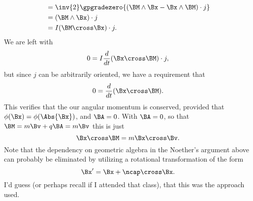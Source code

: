 {\begin{equation}
\begin{aligned}
&= \inv{2} \gpgradezero{ \left( \BM \wedge \Bx - \Bx \wedge \BM \right) \cdot j } \\
&= (\BM \wedge \Bx) \cdot j \\
&= I (\BM \cross \Bx) \cdot j.
\end{aligned}
\end{equation}
%
We are left with
%
\begin{equation}\label{eqn:classicalMechanicsPs2:910}
0 = I \frac{d}{dt} (\Bx \cross \BM) \cdot j,
\end{equation}
%
but since \(j\) can be arbitrarily oriented, we have a requirement that
%
\begin{equation}\label{eqn:classicalMechanicsPs2:930}
0 = \frac{d}{dt} (\Bx \cross \BM).
\end{equation}
%
This verifies that the our angular momentum is conserved, provided that \(\phi(\Bx) = \phi(\Abs{\Bx})\), and \(\BA = 0\).  With \(\BA = 0\), so that \(\BM = m \Bv + q \BA = m \Bv\) this is just
%
\begin{equation}\label{eqn:classicalMechanicsPs2:870}
\Bx \cross \BM = m \Bx \cross \Bv.
\end{equation}
%
Note that the dependency on geometric algebra in the Noether's argument above can probably be eliminated by utilizing a rotational transformation of the form
%
\begin{equation}\label{eqn:classicalMechanicsPs2:871}
\Bx' = \Bx + \ncap \cross \Bx.
\end{equation}
%
I'd guess (or perhaps recall if I attended that class), that this was the approach used.
%
%
%
%
}
%
